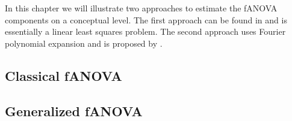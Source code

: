 In this chapter we will illustrate two approaches to estimate the fANOVA components on a conceptual level. The first approach can be found in \cite{hooker2007} and is essentially a linear least squares problem. The second approach uses Fourier polynomial expansion and is proposed by \cite{rahman2014}.

\subsection*{Classical fANOVA}


\subsection*{Generalized fANOVA}